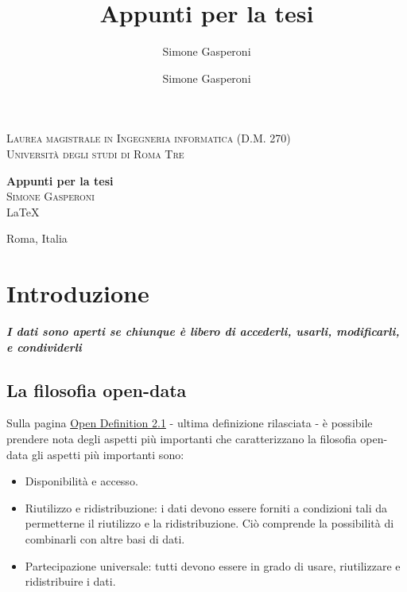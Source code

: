 \documentclass{article}
\author{Simone Gasperoni}
\author{Simone Gasperoni}
\title{Appunti per la tesi}
\theoremstyle{plain}
\theoremstyle{definition}
\begin{document}
\begin{titlepage}
\begin{center}

\textsc{Laurea magistrale in Ingegneria informatica (D.M. 270)}\\[0.5cm]
\textsc{Università degli studi di Roma Tre}\\[0.5cm]

\hrulefill

{ \huge \bfseries Appunti per la tesi \\[0.4cm] }
\textsc{\Large Simone Gasperoni}\\[0.5cm]
\vfill
\LaTeX


Roma, Italia
\end{center}
\end{titlepage}


\tableofcontents

\newpage
\section{Introduzione}
\textbf{\textit{I dati sono aperti se chiunque è libero di accederli, usarli, modificarli, e condividerli}}

\subsection{La filosofia open-data}

Sulla pagina \href{http://opendefinition.org/od/2.1/en}{Open Definition 2.1}\footnotemark
{}
 - ultima definizione rilasciata - è possibile prendere nota degli aspetti più importanti che caratterizzano la filosofia open-data gli aspetti più importanti sono:
\begin{itemize}
\item Disponibilità e accesso.
\item Riutilizzo e ridistribuzione: i dati devono essere forniti a condizioni tali da permetterne il riutilizzo e la ridistribuzione. Ciò comprende la possibilità di combinarli con altre basi di dati.
\item Partecipazione universale: tutti devono essere in grado di usare, riutilizzare e ridistribuire i dati.
\end{itemize}
\end{document}
